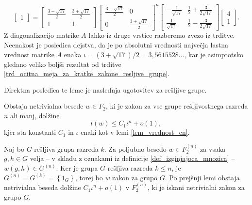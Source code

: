 \begin{dokaz}
\begin{equation*}
\begin{bmatrix}
        1 
    \end{bmatrix} = \begin{bmatrix}
        \frac{3 - \sqrt{17} }{2} & \frac{3 + \sqrt{17} }{2}\\
        1 & 1
    \end{bmatrix} \begin{bmatrix}
        \frac{3 - \sqrt{17} }{2} & 0\\
        0 & \frac{3 + \sqrt{17} }{2}
    \end{bmatrix}^{n} 
    \begin{bmatrix}
        - \frac{1}{\sqrt{17} } & \frac{1}{2} + \frac{3}{2 \sqrt{17} }\\
        \frac{1}{\sqrt{17} } & \frac{1}{2} - \frac{3}{2 \sqrt{17} }
    \end{bmatrix}
    \begin{bmatrix}
        4 \\
        1 
    \end{bmatrix}.
    \end{equation*}  
    Z diagonalizacijo matrike $A$ lahko iz druge vrstice razberemo zvezo iz trditve. Neenakost je posledica dejstva,
     da je po absolutni vrednosti največja lastna vrednost matrike $A$ enaka $\iota = (3 + \sqrt{17})  / 2 = 3{,}5615528 \ldots$, kar je asimptotsko gledano veliko boljši rezultat od trditve \ref{trd_ocitna_meja_za_kratke_zakone_resljive_grupe}.
\end{dokaz} 

Direktna posledica te leme je naslednja ugotovitev za rešljive grupe.

\begin{trditev}
\label{trd_osnovna_ocena_resljive_grupe} 
 Obstaja netrivialna besede $w \in F_2$, ki je zakon za vse grupe rešljivostnega razreda $n$ ali manj, dolžine \begin{equation*}
 l(w) \le C_1 \iota^{n} + o(1),
 \end{equation*}  
 kjer sta konstanti $C_1$ in $\iota$ enaki kot v lemi \ref{lem_vrednost_cn}.  
\end{trditev}
\begin{dokaz}
    Naj bo $G$ rešljiva grupa razreda $k$. Za poljubno besedo $w \in F_2^{(n)}$ za vsaka $g, h \in G$ velja -- v skladu z oznakami iz definicije \ref{def_izginjajoca_mnozica} -- $w(g,h) \in G^{(n)}$. 
    Ker je grupa $G$ rešljiva razreda $k \le n$, je $G^{(n)} = G^{(k)} = \left\{  1_G \right\}$,
    torej bo $w$ zakon za grupo $G$. Po prejšnji lemi obstaja netrivialna beseda dolžine $C_1 \iota^{n} +o(1)$ v $F_2^{(n)}$, ki je iskani netrivialni zakon za grupo $G$.
\end{dokaz}

